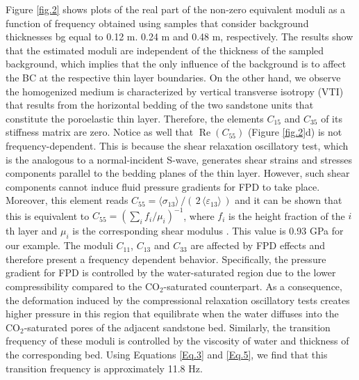 \documentclass[draft]{agujournal2019}
\renewcommand{\Re}{\operatorname{Re} }
\begin{document}
Figure \ref{fig.2} shows plots of the real part of the non-zero equivalent moduli as a function of frequency obtained using samples that consider background thicknesses bg equal to 0.12 m. 0.24 m and 0.48 m, respectively. The results show that the estimated moduli are independent of the thickness of the sampled background, which implies that the only influence of the background is to affect the BC at the respective thin layer boundaries. 
On the other hand, we observe the homogenized medium is
characterized by vertical transverse isotropy (VTI) that results from the horizontal bedding of the two sandstone units that constitute the poroelastic thin layer. Therefore, the elements $C_{15}$ and $C_{35}$ of its stiffness matrix are zero. Notice as well that $\Re(C_{55})$  (Figure \ref{fig.2}d) is not frequency-dependent. This is because the shear relaxation oscillatory test, which is the analogous to a normal-incident S-wave, generates shear strains and stresses components  parallel to the bedding planes of the thin layer. However, such shear components cannot induce fluid pressure gradients for FPD to take place. Moreover, this element reads $C_{55} = \langle \sigma_{13}\rangle\,/(\,2\, \langle \varepsilon_{13} \rangle\,)$ and it can be shown that this is equivalent to $C_{55}  =\left( \sum_i f_i/\mu_i \right)^{-1}$, where $f_i$ is the height fraction of the $i$th layer and $\mu_i$ is the corresponding shear modulus \cite{Backus1962, Salamon1968}. This value is 0.93 GPa for our example. The moduli  $C_{11}$, $C_{13}$ and $C_{33}$ are affected by FPD effects and therefore present a frequency dependent behavior. Specifically, the pressure gradient for FPD is controlled by the water-saturated region due to the lower compressibility compared to the CO$_2$-saturated counterpart. As a consequence, the deformation induced by the compressional relaxation oscillatory tests creates higher pressure in this region that equilibrate when the water diffuses into the CO$_2$-saturated pores of the adjacent sandstone bed. Similarly, the transition frequency of these moduli is controlled by the viscosity of water and thickness of the corresponding bed. Using Equations \eqref{Eq.3} and \eqref{Eq.5}, we find that this transition frequency is approximately 11.8 Hz. 
\end{document}
